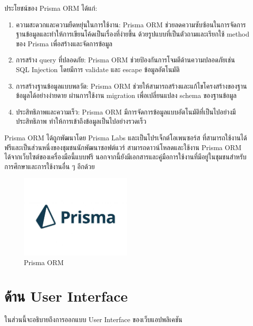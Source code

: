 ประโยชน์ของ Prisma ORM ได้แก่:
\begin{enumerate}
    \item ความสะดวกและความยืดหยุ่นในการใช้งาน: Prisma ORM ช่วยลดความซับซ้อนในการจัดการฐานข้อมูลและทำให้การเขียนโค้ดเป็นเรื่องที่ง่ายขึ้น ด้วยรูปแบบที่เป็นตัวถามและเรียกใช้ method ของ Prisma เพื่อสร้างและจัดการข้อมูล
    
    \item การสร้าง query ที่ปลอดภัย: Prisma ORM ช่วยป้องกันการโจมตีด้านความปลอดภัยเช่น SQL Injection โดยมีการ validate และ escape ข้อมูลอัตโนมัติ
    
    \item การสร้างฐานข้อมูลแบบพลวัต: Prisma ORM ช่วยให้สามารถสร้างและแก้ไขโครงสร้างของฐานข้อมูลได้อย่างง่ายดาย ผ่านการใช้งาน migration เพื่อเปลี่ยนแปลง schema ของฐานข้อมูล
    
    \item ประสิทธิภาพและความเร็ว: Prisma ORM มีการจัดการข้อมูลแบบอัตโนมัติที่เป็นไปอย่างมีประสิทธิภาพ ทำให้การเข้าถึงข้อมูลเป็นไปอย่างรวดเร็ว

\end{enumerate}
Prisma ORM ได้ถูกพัฒนาโดย Prisma Labs และเป็นโปรเจ็กต์โอเพนซอร์ส ที่สามารถใช้งานได้ฟรีและเป็นส่วนหนึ่งของชุมชนนักพัฒนาซอฟต์แวร์ สามารถดาวน์โหลดและใช้งาน Prisma ORM ได้จากเว็บไซต์ของเครื่องมือนี้แบบฟรี นอกจากนี้ยังมีเอกสารและคู่มือการใช้งานที่มีอยู่ในชุมชนสำหรับการศึกษาและการใช้งานอื่น ๆ อีกด้วย
\begin{figure}
    \centering
    \includegraphics[width=0.5\textwidth]{img/prisma.jpg}
    \caption{Prisma ORM}
    \label{fig:prisma}
\end{figure}


\section{ด้าน User Interface}
ในส่วนนี้จะอธิบายถึงการออกแบบ User Interface ของเว็บแอปพลิเคชัน

